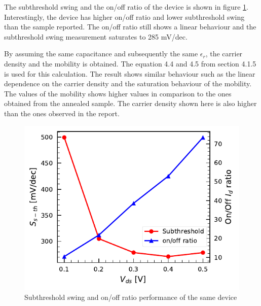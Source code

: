 \documentclass[11pt,a4paper]{report}
\begin{document}
The subthreshold swing and the on/off ratio of the device is shown in figure \ref{fig:Appendix-SS-Onoff}. Interestingly, the device has higher on/off ratio and lower subthreshold swing than the sample reported. The on/off ratio still shows a linear behaviour and the subthreshold swing measurement saturates to 285 mV/dec.

By assuming the same capacitance and subsequently the same $\epsilon_r$, the carrier density and the mobility is obtained. The equation 4.4 and 4.5 from section 4.1.5 is used for this calculation. The result shows similar behaviour such as the linear dependence on the carrier density and the saturation behaviour of the mobility. The values of the mobility shows higher values in comparison to the ones obtained from the annealed sample. The carrier density shown here is also higher than the ones observed in the report.  

\begin{figure}
    \centering
    \includegraphics[scale=1]{Figures/Batch1/Dev16_Subth-on-off.pdf}
    \caption{Subthreshold swing and on/off ratio performance of the same device}
    \label{fig:Appendix-SS-Onoff}
\end{figure}
\end{document}
